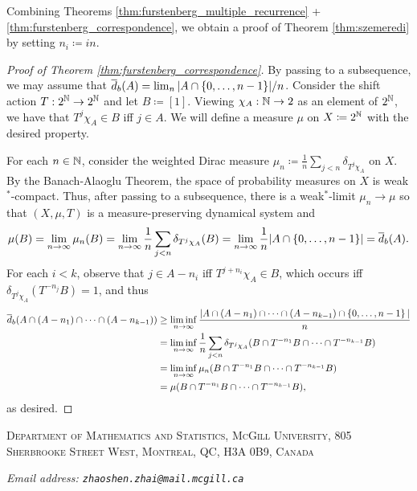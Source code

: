 \documentclass[reqno, twoside]{article}
\begin{document}
    Combining Theorems \ref{thm:furstenberg_multiple_recurrence} + \ref{thm:furstenberg_correspondence}, we obtain a proof of Theorem \ref{thm:szemeredi} by setting $n_i\coloneqq in$.

    \begin{proof}[Proof of Theorem \ref{thm:furstenberg_correspondence}]
        By passing to a subsequence, we may assume that $\overline{d}_b(A)=\lim_n|A\cap\left\{0,\dots,n-1\right\}\!|/n$. Consider the shift action $T:2^{\mathbb{N}}\to2^{\mathbb{N}}$ and let $B\coloneqq[1]$. Viewing $\chi_A:\mathbb{N}\to2$ as an element of $2^{\mathbb{N}}$, we have that $T^j\chi_A\in B$ iff $j\in A$. We will define a measure $\mu$ on $X\coloneqq2^{\mathbb{N}}$ with the desired property.

        For each $n\in\mathbb{N}$, consider the weighted Dirac measure $\mu_n\coloneqq\frac{1}{n}\sum_{j<n}\delta_{T^j\chi_A}$ on $X$. By the Banach-Alaoglu Theorem, the space of probability measures on $X$ is weak$^\ast$-compact. Thus, after passing to a subsequence, there is a weak$^\ast$-limit $\mu_n\to\mu$ so that $(X,\mu,T)$ is a measure-preserving dynamical system and
        \vspace{-0.05in}
        \begin{equation*}
            \mu(B)=\lim_{n\to\infty}\mu_n(B)=\lim_{n\to\infty}\frac{1}{n}\sum_{j<n}\delta_{T^j\chi_A}(B)=\lim_{n\to\infty}\frac{1}{n}|A\cap\l\{0,\dots,n-1\r\}\!|=\bar{d}_b(A).
            \vspace{-0.05in}
        \end{equation*}
        For each $i<k$, observe that $j\in A-n_i$ iff $T^{j+n_i}\chi_A\in B$, which occurs iff $\delta_{T^j\chi_A}(T^{-n_j}B)=1$, and thus
        \vspace{-0.05in}
        \begin{equation*}
            \begin{aligned}
                \bar{d}_b(A\cap(A-n_1)\cap\cdots\cap(A-n_{k-1}))&\geq\liminf_{n\to\infty}\frac{|A\cap(A-n_1)\cap\cdots\cap(A-n_{k-1})\cap\l\{0,\dots,n-1\r\}|}{n} \\
                                                                           &=\liminf_{n\to\infty}\frac{1}{n}\sum_{j<n}\delta_{T^j\chi_A}(B\cap T^{-n_1}B\cap\cdots\cap T^{-n_{k-1}}B) \\
                                                                           &=\liminf_{n\to\infty}\mu_n(B\cap T^{-n_1}B\cap\cdots\cap T^{-n_{k-1}}B) \\
                                                                           &=\mu(B\cap T^{-n_1}B\cap\cdots\cap T^{-n_{k-1}}B),
            \end{aligned}
            \vspace{-0.05in}
        \end{equation*}
        as desired.
    \end{proof}

    \printbibliography

    {\footnotesize
        \textsc{Department of Mathematics and Statistics, McGill University, 805 Sherbrooke Street West, Montreal, QC, H3A 0B9, Canada}

        \textit{Email address: \tt{zhaoshen.zhai@mail.mcgill.ca}}
    }
\end{document}
